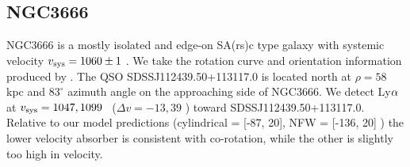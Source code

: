 




\subsection{NGC3666}
NGC3666 is a mostly isolated and edge-on SA(rs)c type galaxy with systemic velocity $v_{\rm sys}=1060 \pm 1$ \kms. We take the rotation curve and orientation information produced by \cite{rhee1996}. The QSO SDSSJ112439.50+113117.0 is located north at $\rho = 58$ kpc and $83^{\circ}$ azimuth angle on the approaching side of NGC3666. We detect Ly$\rm \alpha$ at $v_{\rm sys} = 1047, 1099$ \kms~($\Delta v = -13, 39$ \kms) toward SDSSJ112439.50+113117.0. Relative to our model predictions (cylindrical = [-87, 20], NFW = [-136, 20] \kms) the lower velocity absorber is consistent with co-rotation, while the other is slightly too high in velocity.






